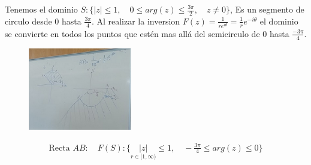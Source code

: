 \documentclass{article}
\begin{document}
Tenemos el dominio $ S: \{ \left|z \right|\leq 1, \quad 0\leq arg(z) \leq \frac{3\pi}{2} , \quad z \neq 0\} $, Es un segmento de circulo desde 0 hasta $ \frac{3\pi}{4} $. Al realizar la inversion $ F(z) = \frac{1}{re ^ {i \theta }} = \frac{1}{r}e ^ {-i\theta } $ el dominio se convierte en todos los puntos que estén mas allá del semicirculo de 0 hasta $ \frac{-3\pi}{4 } $.
\begin{figure}[H]
  \begin{center}
    \includegraphics[width=0.4\textwidth]{inversion_dominio.png}
  \end{center}
\end{figure}
\begin{gather}
  \text{Recta }AB:\quad F\left(S \right): \{ \underset{r\in [1,\infty)}{\left|z \right|}\leq 1, \quad -\frac{3\pi}{4}\leq arg(z)\leq 0 \}
\end{gather}
\end{document}
